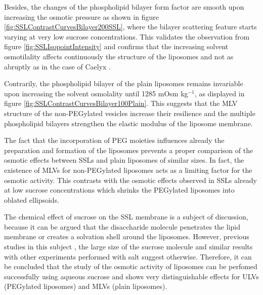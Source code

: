 %		

Besides, the changes of the phospholipid bilayer form factor are smooth upon increasing the osmotic pressure as shown in figure \ref{fig:SSLContrastCurvesBilayer200SSL}, where the bilayer scattering feature starts varying at very low sucrose concentrations. This validates the observation from figure \ref{fig:SSLIsopointIntensity} and confirms that the increasing solvent osmotilality affects continuously the structure of the liposomes and not as abruptly as in the case of Caelyx \textregistered.

Contrarily, the phospholipid bilayer of the plain liposomes remains invariable upon increasing the solvent osmolality until 1285 mOsm kg$^{-1}$, as displayed in figure \ref{fig:SSLContrastCurvesBilayer100Plain}. This suggests that the MLV structure of the non-PEGylated vesicles increase their resilience and the multiple phospholipid bilayers strengthen the elastic modulus of the liposome membrane.

The fact that the incorporation of PEG moieties influences already the preparation and formation of the liposomes prevents a proper comparison of the osmotic effects between SSLs and plain liposomes of similar sizes. In fact, the existence of MLVs for non-PEGylated liposomes acts as a limiting factor for the osmotic activity. This contrasts with the osmotic effects observed in SSLs already at low sucrose concentrations which shrinks the PEGylated liposomes into oblated ellipsoids. 

The chemical effect of sucrose on the SSL membrane is a subject of discussion, because it can be argued that the disaccharide molecule penetrates the lipid membrane or creates a solvation shell around the liposomes. However, previous studies in this subject \citep{kiselev_does_2003, kiselev_sucrose_2001, kiselev_sucrose_2001-1}, the large size of the sucrose molecule and similar results with other experiments performed with salt \citep{varga_osmotic_2014} suggest otherwise. Therefore, it can be concluded that the study of the osmotic activity of liposomes can be perfomed successfully using aqueous sucrose and shows very distinguishable effects for ULVs (PEGylated liposomes) and MLVs (plain liposomes).

